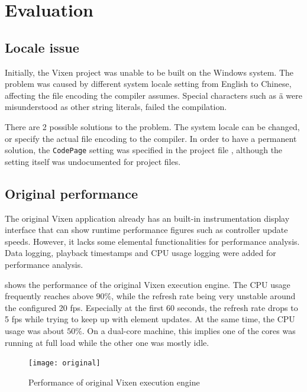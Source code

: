 \chapter{Evaluation}
\renewcommand{\baselinestretch}{\mystretch}
\label{chap:Eval}

\section{Locale issue}

Initially, the Vixen project was unable to be built on the Windows system. The problem was caused by different system locale setting from English to Chinese, affecting the file encoding the compiler assumes. Special characters such as \"a were misunderstood as other string literals, failed the compilation.

There are 2 possible solutions to the problem. The system locale can be changed, or specify the actual file encoding to the compiler. In order to have a permanent solution, the \texttt{CodePage} setting was specified in the project file \cite{codepage}, although the setting itself was undocumented for project files.

\section{Original performance}

The original Vixen application already has an built-in instrumentation display interface that can show runtime performance figures such as controller update speeds. However, it lacks some elemental functionalities for performance analysis. Data logging, playback timestamps and CPU usage logging were added for performance analysis.

 shows the performance of the original Vixen execution engine. The CPU usage frequently reaches above $90 \%$, while the refresh rate being very unstable around the configured 20 fps. Especially at the first 60 seconds, the refresh rate drops to 5 fps while trying to keep up with element updates. At the same time, the CPU usage was about $50 \%$. On a dual-core machine, this implies one of the cores was running at full load while the other one was mostly idle. 

\begin{figure}[t]
  \centering
  \texttt{[image: original]}
  \caption{Performance of original Vixen execution engine}
  \label{fig:original}
\end{figure}


